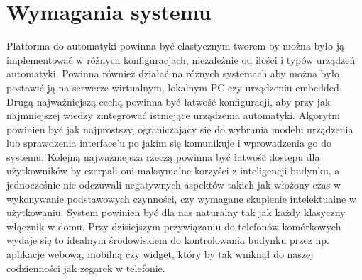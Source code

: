 \chapter{Wymagania systemu}
Platforma do automatyki powinna być elastycznym tworem by można było ją implementować w różnych konfiguracjach,  niezależnie od ilości i typów urządzeń automatyki. Powinna również działać na różnych systemach aby można było postawić ją na serwerze wirtualnym, lokalnym PC czy urządzeniu embedded. Drugą najważniejszą cechą powinna być łatwość konfiguracji, aby przy jak najmniejszej wiedzy zintegrować istniejące urządzenia automatyki. Algorytm powinien być jak najprostszy, ograniczający się do wybrania modelu urządzenia lub sprawdzenia interface'u po jakim się komunikuje i wprowadzenia go do systemu. Kolejną najważniejsza rzeczą powinna być łatwość dostępu dla użytkowników by czerpali oni maksymalne korzyści z inteligencji budynku, a jednocześnie nie odczuwali negatywnych aspektów takich jak włożony czas w wykonywanie podstawowych czynności, czy wymagane skupienie intelektualne w użytkowaniu. System powinien być dla nas naturalny tak jak każdy klasyczny włącznik w domu. Przy dzisiejszym przywiązaniu do telefonów komórkowych wydaje się to idealnym środowiskiem do kontrolowania budynku przez np. aplikacje webową, mobilną czy widget, który by tak wniknął do naszej codzienności jak zegarek w telefonie.